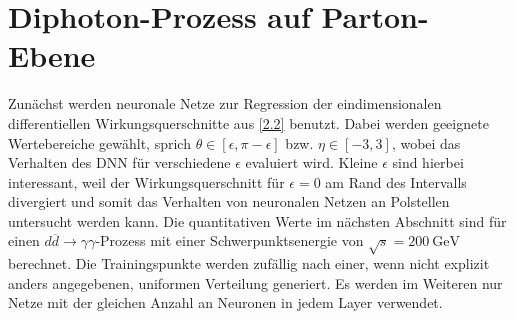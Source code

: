 \section{Diphoton-Prozess auf Parton-Ebene}
\label{4.1}
Zunächst werden neuronale Netze zur Regression der eindimensionalen differentiellen Wirkungsquerschnitte aus \textsf{\autoref{2.2}} benutzt. Dabei werden geeignete Wertebereiche gewählt, sprich $\theta \in [\epsilon, \pi - \epsilon]$ bzw. $\eta \in [-3, 3]$, wobei das Verhalten des DNN für verschiedene $\epsilon$ evaluiert wird. Kleine $\epsilon$ sind hierbei interessant, weil der Wirkungsquerschnitt für $\epsilon = 0$ am Rand des Intervalls divergiert und somit das Verhalten von neuronalen Netzen an Polstellen untersucht werden kann. Die quantitativen Werte im nächsten Abschnitt sind für einen $d\overline{d} \rightarrow \gamma \gamma$-Prozess mit einer Schwerpunktsenergie von $\sqrt{s} = 200~\text{GeV}$ berechnet. Die Trainingspunkte werden zufällig nach einer, wenn nicht explizit anders angegebenen, uniformen Verteilung generiert.  
Es werden im Weiteren nur Netze mit der gleichen Anzahl an Neuronen in jedem Layer verwendet.

